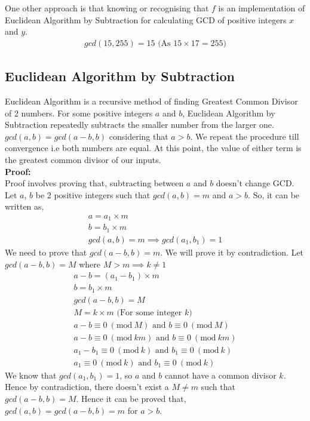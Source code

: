 \documentclass[journal,12pt,twocolumn]{IEEEtran}
\begin{document}
\quad One other approach is that knowing or recognising that $f$ is an implementation of Euclidean Algorithm by Subtraction for calculating GCD of positive integers $x$ and $y$.
\begin{align}
	gcd(15,255) = 15 \text{ (As $15 \times 17 = 255$)} 
\end{align}

\subsection{Euclidean Algorithm by Subtraction}
Euclidean Algorithm is a recursive method of finding Greatest Common Divisor of 2 numbers. For some positive integers $a$ and $b$, Euclidean Algorithm by Subtraction repeatedly subtracts the smaller number from the larger one. $gcd(a,b) = gcd(a-b,b)$ considering that $a > b$. We repeat the procedure till convergence i.e both numbers are equal. At this point, the value of either term is the greatest common divisor of our inputs.\\
\textbf{Proof:}\\
Proof involves proving that, subtracting between $a$ and $b$ doesn't change GCD. Let $a$, $b$ be 2 positive integers such that $gcd(a,b) = m$ and $a > b$. So, it can be written as,
\begin{align}
    a = a_{1} \times m \\
    b = b_{1} \times m \\
    gcd(a,b) = m \implies gcd(a_{1}, b_{1}) = 1
\end{align}
We need to prove that $gcd(a-b,b) = m$. We will prove it by contradiction. Let $gcd(a-b,b) = M$ where $M > m \implies 
 k \neq 1$
\begin{align}
    a-b = (a_{1} - b_{1}) \times m\\
    b =  b_{1} \times m\\
    gcd(a-b,b) = M\\
    M = k \times m \text{ (For some integer $k$)}\\
    a-b \equiv 0\ (\textrm{mod}\ M) \text{ and } b \equiv 0\ (\textrm{mod}\ M)\\
    a-b \equiv 0\ (\textrm{mod}\ km) \text{ and } b \equiv 0\ (\textrm{mod}\ km)\\
    a_{1} - b_{1} \equiv 0\ (\textrm{mod}\ k) \text{ and } b_{1} \equiv 0\ (\textrm{mod}\ k)\\
    a_{1} \equiv 0\ (\textrm{mod}\ k) \text{ and } b_{1} \equiv 0\ (\textrm{mod}\ k)
\end{align}
We know that $gcd(a_{1}, b_{1}) = 1$, so $a$ and $b$ cannot have a common divisor $k$. Hence by contradiction, there doesn't exist a $M \neq m$ such that $gcd(a-b, b) = M$. Hence it can be proved that, $gcd(a, b) = gcd(a-b, b) = m$ for $a > b$.\\
\end{document}
